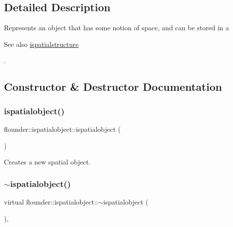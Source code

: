 \subsection{Detailed Description}
Represents an object that has some notion of space, and can be stored in a \begin{DoxySeeAlso}{See also}
\hyperlink{classflounder_1_1ispatialstructure}{ispatialstructure}


\end{DoxySeeAlso}
. 



\subsection{Constructor \& Destructor Documentation}
\mbox{\label{classflounder_1_1ispatialobject_ad0a12c2658487000d8a00ce24df04e77}} 
\subsubsection{\texorpdfstring{ispatialobject()}{ispatialobject()}}
{\footnotesize\ttfamily flounder\+::ispatialobject\+::ispatialobject (\begin{DoxyParamCaption}{ }\end{DoxyParamCaption})\hspace{0.3cm}{\ttfamily [inline]}}



Creates a new spatial object. 

\mbox{\label{classflounder_1_1ispatialobject_aa382517fbb4b23ea482988fbd2d267ad}} 
\subsubsection{\texorpdfstring{$\sim$ispatialobject()}{~ispatialobject()}}
{\footnotesize\ttfamily virtual flounder\+::ispatialobject\+::$\sim$ispatialobject (\begin{DoxyParamCaption}{ }\end{DoxyParamCaption})\hspace{0.3cm}{\ttfamily [inline]}, {\ttfamily [virtual]}}



